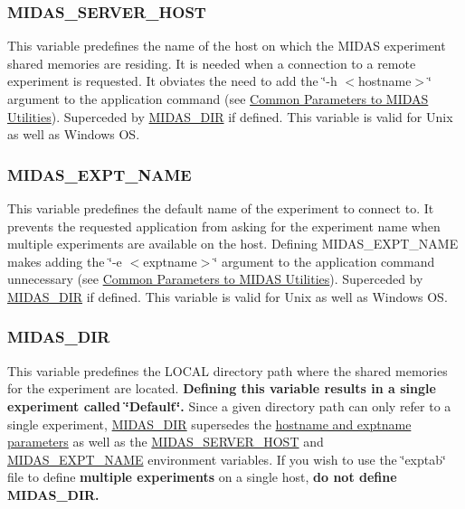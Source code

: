 \label{BuildingOptions_idx_MIDAS_SERVER_HOST}
\hypertarget{BuildingOptions_idx_MIDAS_SERVER_HOST}{}
 

\hypertarget{BuildingOptions_BO_MIDAS_SERVER_HOST}{}\subsubsection{MIDAS\_\-SERVER\_\-HOST}\label{BuildingOptions_BO_MIDAS_SERVER_HOST}
This variable predefines the name of the host on which the MIDAS experiment shared memories are residing. It is needed when a connection to a remote experiment is requested. It obviates the need to add the \char`\"{}-\/h $<$hostname$>$\char`\"{} argument to the application command (see \hyperlink{F_Utilities_List_F_utilities_params}{Common Parameters to MIDAS Utilities}). Superceded by \hyperlink{BuildingOptions_BO_MIDAS_DIR}{MIDAS\_\-DIR} if defined. This variable is valid for Unix as well as Windows OS.

\label{BuildingOptions_idx_MIDAS_EXPT_NAME}
\hypertarget{BuildingOptions_idx_MIDAS_EXPT_NAME}{}
 

\hypertarget{BuildingOptions_BO_MIDAS_EXPT_NAME}{}\subsubsection{MIDAS\_\-EXPT\_\-NAME}\label{BuildingOptions_BO_MIDAS_EXPT_NAME}
This variable predefines the default name of the experiment to connect to. It prevents the requested application from asking for the experiment name when multiple experiments are available on the host. Defining MIDAS\_\-EXPT\_\-NAME makes adding the \char`\"{}-\/e $<$exptname$>$\char`\"{} argument to the application command unnecessary (see \hyperlink{F_Utilities_List_F_utilities_params}{Common Parameters to MIDAS Utilities}). Superceded by \hyperlink{BuildingOptions_BO_MIDAS_DIR}{MIDAS\_\-DIR} if defined. This variable is valid for Unix as well as Windows OS.

\label{BuildingOptions_idx_MIDAS_DIR}
\hypertarget{BuildingOptions_idx_MIDAS_DIR}{}
 

\hypertarget{BuildingOptions_BO_MIDAS_DIR}{}\subsubsection{MIDAS\_\-DIR}\label{BuildingOptions_BO_MIDAS_DIR}
This variable predefines the LOCAL directory path where the shared memories for the experiment are located. {\bfseries Defining this variable results in a single experiment called \char`\"{}Default\char`\"{}.} Since a given directory path can only refer to a single experiment, \hyperlink{BuildingOptions_BO_MIDAS_DIR}{MIDAS\_\-DIR} supersedes the \hyperlink{F_Utilities_List_F_utilities_params}{hostname and exptname parameters} as well as the \hyperlink{BuildingOptions_BO_MIDAS_SERVER_HOST}{MIDAS\_\-SERVER\_\-HOST} and \hyperlink{BuildingOptions_BO_MIDAS_EXPT_NAME}{MIDAS\_\-EXPT\_\-NAME} environment variables.  If you wish to use the \char`\"{}exptab\char`\"{} file to define {\bfseries multiple experiments} on a single host, {\bfseries do not define MIDAS\_\-DIR. }

